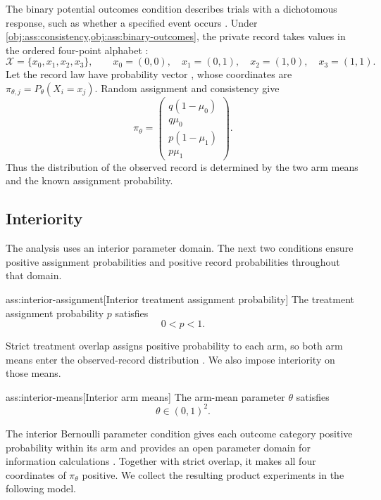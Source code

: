 The binary potential outcomes condition describes trials with a dichotomous response, such as whether a specified event occurs \citep{OhnishiAwan2025}. Under \cref{obj:ass:consistency,obj:ass:binary-outcomes}, the private record takes values in the ordered four-point alphabet :
\[
\mathcal X=\{x_0,x_1,x_2,x_3\},
\qquad
x_0=(0,0),\quad x_1=(0,1),\quad
x_2=(1,0),\quad x_3=(1,1).
\]
Let the record law  have probability vector , whose coordinates are \(\pi_{\theta,j}=P_\theta(X_i=x_j)\). Random assignment and consistency give
\[
\pi_\theta=
\begin{pmatrix}
q(1-\mu_0)\\
q\mu_0\\
p(1-\mu_1)\\
p\mu_1
\end{pmatrix}.
\]
Thus the distribution of the observed record is determined by the two arm means and the known assignment probability.

\subsection{Interiority}

The analysis uses an interior parameter domain. The next two conditions ensure positive assignment probabilities and positive record probabilities throughout that domain.

\begin{assumptionv}{ass:interior-assignment}[Interior treatment assignment probability]
The treatment assignment probability \(p\) satisfies
\[
0<p<1.
\]
\end{assumptionv}

Strict treatment overlap assigns positive probability to each arm, so both arm means enter the observed-record distribution \citep{OhnishiAwan2025}. We also impose interiority on those means.

\begin{assumptionv}{ass:interior-means}[Interior arm means]
The arm-mean parameter \(\theta\) satisfies
\[
\theta\in(0,1)^2.
\]
\end{assumptionv}

The interior Bernoulli parameter condition gives each outcome category positive probability within its arm and provides an open parameter domain for information calculations \citep{Steinberger2024}. Together with strict overlap, it makes all four coordinates of \(\pi_\theta\) positive. We collect the resulting product experiments in the following model.

